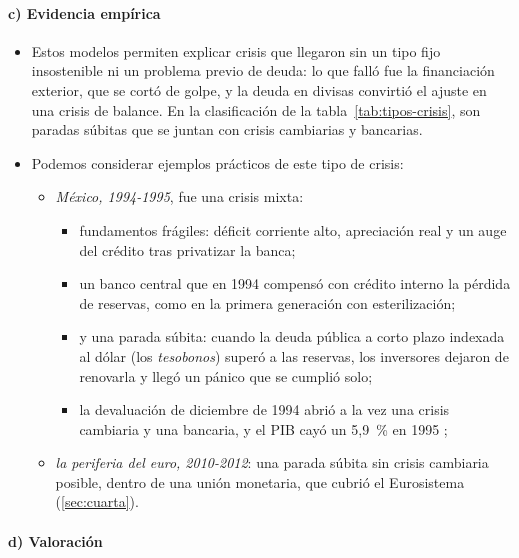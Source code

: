 \documentclass[11pt]{article}
\begin{document}
\paragraph{c) Evidencia empírica}

\begin{itemize}
\item Estos modelos permiten explicar crisis que llegaron sin un tipo fijo insostenible ni un problema previo de deuda: lo que falló fue la financiación exterior, que se cortó de golpe, y la deuda en divisas convirtió el ajuste en una crisis de balance. En la clasificación de la tabla~\ref{tab:tipos-crisis}, son paradas súbitas que se juntan con crisis cambiarias y bancarias.
\item Podemos considerar ejemplos prácticos de este tipo de crisis:
  \begin{itemize}
  \item \emph{México, 1994-1995}, fue una crisis mixta:
    \begin{itemize}
    \item fundamentos frágiles: déficit corriente alto, apreciación real y un auge del crédito tras privatizar la banca;
    \item un banco central que en 1994 compensó con crédito interno la pérdida de reservas, como en la primera generación con esterilización\nocite{FloodGarberKramer1996Collapsing};
    \item y una parada súbita: cuando la deuda pública a corto plazo indexada al dólar (los \emph{tesobonos}) superó a las reservas, los inversores dejaron de renovarla y llegó un pánico que se cumplió solo\nocite{STV1996Lessons,ColeKehoe1996Mexico,CalvoMendoza1996};
    \item la devaluación de diciembre de 1994 abrió a la vez una crisis cambiaria y una bancaria, y el PIB cayó un 5,9~\% en 1995\nocite{FMI2026WEOdatos}  ;
    \end{itemize}
  \item \emph{la periferia del euro, 2010-2012}: una parada súbita sin crisis cambiaria posible, dentro de una unión monetaria, que cubrió el Eurosistema\nocite{MerlerPisaniFerry2012Sudden} (\ref{sec:cuarta}).
  \end{itemize}
\end{itemize}

\paragraph{d) Valoración}
\end{document}
